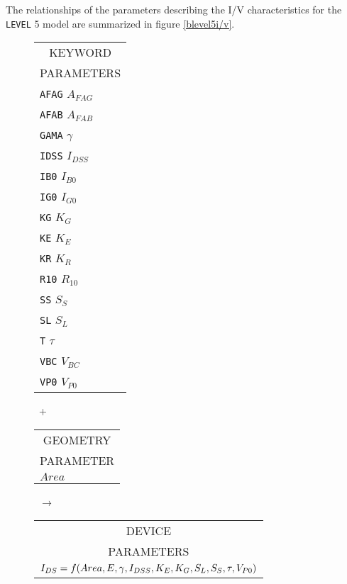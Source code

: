 The relationships of the parameters describing the I/V
characteristics for the {\tt LEVEL} 5 model are summarized in figure
\ref{blevel5i/v}.\\[0.1in]
\begin{figure}[h]
\begin{tabular}[t]{|p{1in}|}
\hline
\multicolumn{1}{|c|}{KEYWORD} \\
\multicolumn{1}{|c|}{PARAMETERS} \\
\hline
\hline
{\tt AFAG} \hfill $A_{FAG}$\\
{\tt AFAB} \hfill $A_{FAB}$\\
{\tt GAMA} \hfill $\gamma$\\
{\tt IDSS} \hfill $I_{DSS}$\\
{\tt IB0} \hfill $I_{B0}$\\
{\tt IG0} \hfill $I_{G0}$\\
{\tt KG} \hfill $K_G$\\
{\tt KE} \hfill $K_E$\\
{\tt KR} \hfill $K_R$\\
{\tt R10} \hfill $R_{10}$\\
{\tt SS} \hfill $S_S$\\
{\tt SL} \hfill $S_L$\\
{\tt T} \hfill $\tau$\\
{\tt VBC} \hfill $V_{BC}$\\
{\tt VP0} \hfill $V_{P0}$\\
\hline
\end{tabular}
\hfill
\parbox{0.2in}{\ \vspace*{0.2in}\newline +}
\hfill
\begin{tabular}[t]{|p{1in}|}
\hline
\multicolumn{1}{|c|}{GEOMETRY} \\
\multicolumn{1}{|c|}{PARAMETER} \\
\hline
\hspace*{\fill}$Area$\\
\hline
\end{tabular}
\hfill
\parbox{0.2in}{\ \vspace*{0.2in}\newline $\rightarrow$}
\hfill
\begin{tabular}[t]{|p{1.8in}|}
\hline
\multicolumn{1}{|c|}{DEVICE} \\
\multicolumn{1}{|c|}{PARAMETERS} \\
\hline
$I_{DS} = f(Area, E, \gamma, I_{DSS},
       \newline\hspace*{\fill} K_E, K_G, S_L, S_S, \tau, V_{P0})$\\

\end{tabular}
\end{figure}
